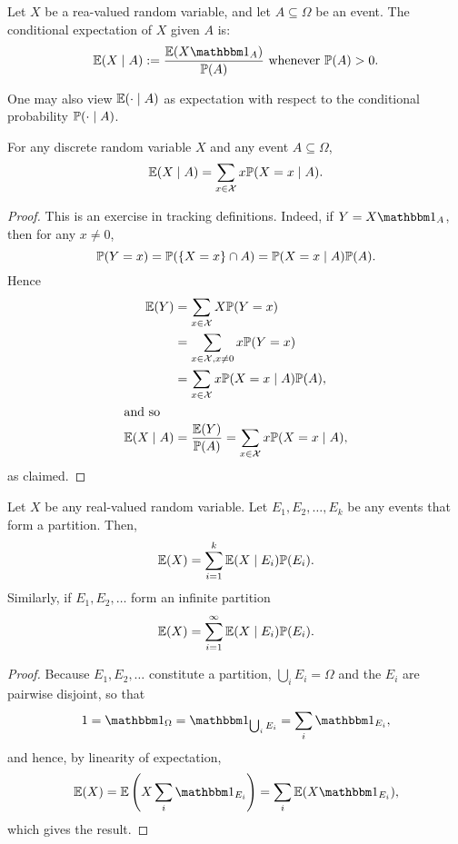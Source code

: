 \documentclass[10pt, a4paper]{article}
\begin{document}
\begin{definition}
    Let $X$ be a rea-valued random variable,
    and let $A \subseteq \Omega$ be an event.
    The conditional expectation of $X$ given $A$ is:
    \[
    \E(X \mid A) := \frac{\E(X\ind)}{\P(A)}\text{ whenever $\P(A) > 0$}.
    \]
\end{definition}

One may also view $\E(\cdot\mid A)$ as expectation with respect to the conditional probability $\P(\cdot\mid A)$.
\begin{theorem}
    For any discrete random variable $X$ and any event $A \subseteq \Omega$,
    \[
    \E(X\mid A) = \sum_{x \in \mathcal{X}}x\P(X = x\mid A).
    \]
    \begin{proof}
        This is an exercise in tracking definitions.
        Indeed,
        if $Y = X\ind$,
        then for any $x \neq 0$,
        \[
        \P(Y = x) = \P(\{X = x\} \cap A) = \P(X = x\mid A)\P(A).
        \]
        Hence
        \begin{align*}
            \E(Y) &= \sum_{x \in \mathcal{X}}X\P(Y = x) \\
            &= \sum_{x \in \mathcal{X}, x \neq 0}x\P(Y = x) \\
            &= \sum_{x \in \mathcal{X}}x\P(X = x\mid A)\P(A), \\
            \intertext{and so}
            \E(X \mid A) &= \frac{\E(Y)}{\P(A)} = \sum_{x \in \mathcal{X}}x\P(X = x\mid A),
        \end{align*}
        as claimed.
    \end{proof}
\end{theorem}

\begin{theorem}\label{pre:prob:thm:partthmforexp}
    Let $X$ be any real-valued random variable.
    Let $E_1, E_2, \dotsc, E_k$ be any events that form a partition.
    Then,
    \[
    \E(X) = \sum_{i = 1}^{k}\E(X \mid E_i)\P(E_i).
    \]
    Similarly,
    if $E_1, E_2, \dotsc$ form an infinite partition
    \[
    \E(X) = \sum_{i = 1}^{\infty}\E(X \mid E_i)\P(E_i).
    \]
    \begin{proof}
        Because $E_1, E_2, \dotsc$ constitute a partition,
        $\bigcup_iE_i = \Omega$ and the $E_i$ are pairwise disjoint,
        so that
        \[
        1 = \ind[\Omega] = \ind[\bigcup_iE_i] = \sum_{i}\ind[E_i],
        \]
        and hence,
        by linearity of expectation,
        \[
        \E(X) = \E\left(X\sum_{i}\ind[E_i]\right) = \sum_{i}\E(X\ind[E_i]),
        \]
        which gives the result.
    \end{proof}
\end{theorem}
\end{document}
